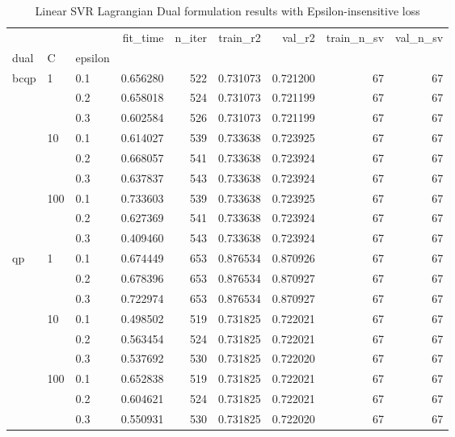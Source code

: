 \begin{table}[H]
\centering
\caption{Linear SVR Lagrangian Dual formulation results with Epsilon-insensitive loss}
\label{linear_lagrangian_dual_svr_cv_results}
\begin{tabular}{lllrrrrrr}
\toprule
   &     &     &  fit\_time &  n\_iter &  train\_r2 &    val\_r2 &  train\_n\_sv &  val\_n\_sv \\
dual & C & epsilon &           &         &           &           &             &           \\
\midrule
bcqp & 1   & 0.1 &  0.656280 &     522 &  0.731073 &  0.721200 &          67 &        67 \\
   &     & 0.2 &  0.658018 &     524 &  0.731073 &  0.721199 &          67 &        67 \\
   &     & 0.3 &  0.602584 &     526 &  0.731073 &  0.721199 &          67 &        67 \\
   & 10  & 0.1 &  0.614027 &     539 &  0.733638 &  0.723925 &          67 &        67 \\
   &     & 0.2 &  0.668057 &     541 &  0.733638 &  0.723924 &          67 &        67 \\
   &     & 0.3 &  0.637837 &     543 &  0.733638 &  0.723924 &          67 &        67 \\
   & 100 & 0.1 &  0.733603 &     539 &  0.733638 &  0.723925 &          67 &        67 \\
   &     & 0.2 &  0.627369 &     541 &  0.733638 &  0.723924 &          67 &        67 \\
   &     & 0.3 &  0.409460 &     543 &  0.733638 &  0.723924 &          67 &        67 \\
qp & 1   & 0.1 &  0.674449 &     653 &  0.876534 &  0.870926 &          67 &        67 \\
   &     & 0.2 &  0.678396 &     653 &  0.876534 &  0.870927 &          67 &        67 \\
   &     & 0.3 &  0.722974 &     653 &  0.876534 &  0.870927 &          67 &        67 \\
   & 10  & 0.1 &  0.498502 &     519 &  0.731825 &  0.722021 &          67 &        67 \\
   &     & 0.2 &  0.563454 &     524 &  0.731825 &  0.722021 &          67 &        67 \\
   &     & 0.3 &  0.537692 &     530 &  0.731825 &  0.722020 &          67 &        67 \\
   & 100 & 0.1 &  0.652838 &     519 &  0.731825 &  0.722021 &          67 &        67 \\
   &     & 0.2 &  0.604621 &     524 &  0.731825 &  0.722021 &          67 &        67 \\
   &     & 0.3 &  0.550931 &     530 &  0.731825 &  0.722020 &          67 &        67 \\
\bottomrule
\end{tabular}
\end{table}
